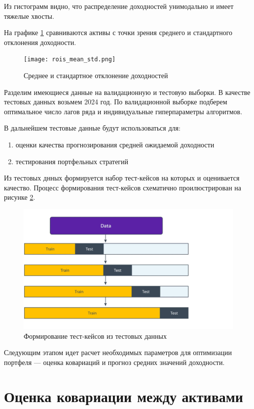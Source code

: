 Из гистограмм видно, что распределение доходностей унимодально и имеет тяжелые хвосты.

На графике \ref{fig:rois_mean_std} сравниваются активы с точки зрения 
среднего и стандартного отклонения доходности.

\begin{figure}[H]
	\centering
	\texttt{[image: rois\_mean\_std.png]}
	\caption{Среднее и стандартное отклонение доходностей}
	\label{fig:rois_mean_std}
\end{figure}

Разделим имеющиеся данные на валидационную и тестовую выборки. В качестве тестовых данных возьмем 2024 год.
По валидационной выборке подберем оптимальное число лагов ряда и индивидуальные гиперпараметры алгоритмов.

В дальнейшем тестовые данные будут использоваться для:
\begin{enumerate}
	\item оценки качества прогнозирования средней ожидаемой доходности
	\item тестирования портфельных стратегий
\end{enumerate}

Из тестовых днных формируется набор тест-кейсов на которых и оценивается качество.
Процесс формирования тест-кейсов схематично проилюстрирован на рисунке \ref{fig:ts_csv}.
\begin{figure}[H]
	\centering
	\includegraphics[width=\textwidth]{images/ts_cv}
	\caption{Формирование тест-кейсов из тестовых данных}
	\label{fig:ts_csv}
\end{figure}

Следующим этапом идет расчет необходимых параметров для оптимизации портфеля --- 
оценка ковариаций и прогноз средних значений доходности.

\section{Оценка ковариации между активами}


